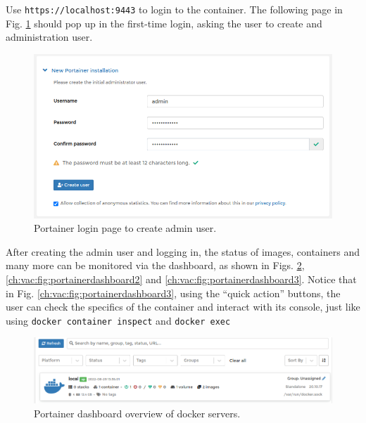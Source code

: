 Use \verb|https://localhost:9443| to login to the container. The following page in Fig. \ref{ch:vac:fig:portainerlogin} should pop up in the first-time login, asking the user to create and administration user.
\begin{figure}
	\centering
	\includegraphics[width=350pt]{chapters/ch-virtualization-and-containerization/figures/portainerlogin.png}
	\caption{Portainer login page to create admin user.} \label{ch:vac:fig:portainerlogin}
\end{figure}

After creating the admin user and logging in, the status of images, containers and many more can be monitored via the dashboard, as shown in Figs. \ref{ch:vac:fig:portainerdashboard1}, \ref{ch:vac:fig:portainerdashboard2} and \ref{ch:vac:fig:portainerdashboard3}. Notice that in Fig. \ref{ch:vac:fig:portainerdashboard3}, using the ``quick action'' buttons, the user can check the specifics of the container and interact with its console, just like using \verb|docker container inspect| and \verb|docker exec|
\begin{figure}
	\centering
	\includegraphics[width=350pt]{chapters/ch-virtualization-and-containerization/figures/portainerdashboard1.png}
	\caption{Portainer dashboard overview of docker servers.} \label{ch:vac:fig:portainerdashboard1}
\end{figure}

